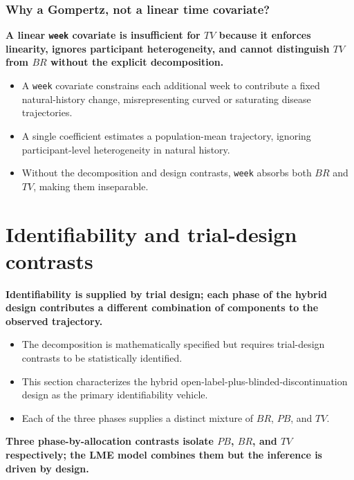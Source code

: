 \documentclass[
  11pt,
]{article}
\begin{document}
\subsubsection{Why a Gompertz, not a linear time covariate?}\label{why-a-gompertz-not-a-linear-time-covariate}

\textbf{A linear \texttt{week} covariate is insufficient for $TV$ because it enforces linearity, ignores participant heterogeneity, and cannot distinguish $TV$ from $BR$ without the explicit decomposition.}

\begin{itemize}\setlength{\itemsep}{2pt}\setlength{\parskip}{0pt}
\item A \texttt{week} covariate constrains each additional week to contribute a fixed natural-history change, misrepresenting curved or saturating disease trajectories.
\item A single coefficient estimates a population-mean trajectory, ignoring participant-level heterogeneity in natural history.
\item Without the decomposition and design contrasts, \texttt{week} absorbs both $BR$ and $TV$, making them inseparable.
\end{itemize}

\section{Identifiability and trial-design contrasts}\label{identifiability-and-trial-design-contrasts}

\textbf{Identifiability is supplied by trial design; each phase of the hybrid design contributes a different combination of components to the observed trajectory.}

\begin{itemize}\setlength{\itemsep}{2pt}\setlength{\parskip}{0pt}
\item The decomposition is mathematically specified but requires trial-design contrasts to be statistically identified.
\item This section characterizes the hybrid open-label-plus-blinded-discontinuation design as the primary identifiability vehicle.
\item Each of the three phases supplies a distinct mixture of $BR$, $PB$, and $TV$.
\end{itemize}

\textbf{Three phase-by-allocation contrasts isolate $PB$, $BR$, and $TV$ respectively; the LME model combines them but the inference is driven by design.}
\end{document}
